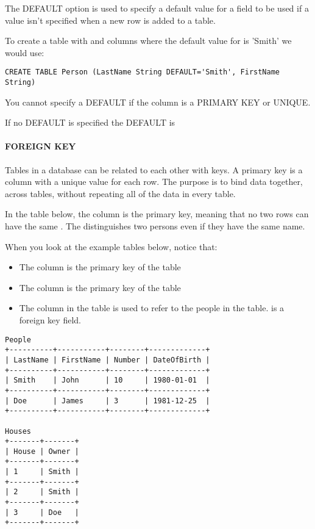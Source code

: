 \documentclass{howto}
\begin{document}
The DEFAULT option is used to specify a default value for a field to be used if a value isn't specified when a new row is added to a table.

To create a table with  and  columns where the default value for  is 'Smith' we would use:

\begin{verbatim}
CREATE TABLE Person (LastName String DEFAULT='Smith', FirstName String)
\end{verbatim}

You cannot specify a DEFAULT if the column is a PRIMARY KEY or UNIQUE.

If no DEFAULT is specified the DEFAULT is 

\paragraph{FOREIGN KEY\label{ForeignKeys}}

Tables in a database can be related to each other with keys. A primary key is a column with a unique value for each row. The purpose is to bind data together, across tables, without repeating all of the data in every table.

In the  table below, the  column is the primary key, meaning that no two rows can have the same . The  distinguishes two persons even if they have the same name.

When you look at the example tables below, notice that: 
\begin{itemize}
\item
The  column is the primary key of the  table
\item
The  column is the primary key of the  table
\item
The  column in the  table is used to refer to the people in the  table.  is a foreign key field.
\end{itemize}

\begin{verbatim}
People
+----------+-----------+--------+-------------+
| LastName | FirstName | Number | DateOfBirth |
+----------+-----------+--------+-------------+
| Smith    | John      | 10     | 1980-01-01  |
+----------+-----------+--------+-------------+
| Doe      | James     | 3      | 1981-12-25  |
+----------+-----------+--------+-------------+

Houses
+-------+-------+
| House | Owner |
+-------+-------+
| 1     | Smith |
+-------+-------+
| 2     | Smith |
+-------+-------+
| 3     | Doe   |
+-------+-------+
\end{verbatim}
\end{document}
